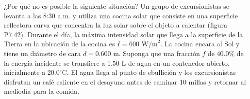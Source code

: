 \item ¿Por qué no es posible la siguiente situación? Un grupo de excursionistas se levanta a las 8:30 a.m. y utiliza una cocina solar que consiste en una superficie reflectora curva que concentra la luz solar sobre el objeto a calentar (figura P7.42). Durante el día, la máxima intensidad solar que llega a la superficie de la Tierra en la ubicación de la cocina es $I = 600\text{ W/m}^2$. La cocina encara al Sol y tiene un diámetro de cara $d = 0.600\text{ m}$. Suponga que una fracción $f$ de 40.0\% de la energía incidente se transfiere a 1.50 L de agua en un contenedor abierto, inicialmente a $20.0^\circ\text{C}$. El agua llega al punto de ebullición y los excursionistas disfrutan un café caliente en el desayuno antes de caminar 10 millas y retornar al mediodía para la comida.
